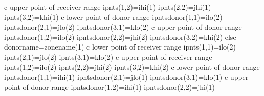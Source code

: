 \documentclass[12pt]{article}
\begin{document}
{\newline c   upper point of receiver range
\newline\indent\indent\indent      ipnts(1,2)=ihi(1)
\newline\indent\indent\indent      ipnts(2,2)=jhi(1)
\newline\indent\indent\indent      ipnts(3,2)=khi(1)
\newline c   lower point of donor range
\newline\indent\indent\indent      ipntsdonor(1,1)=ilo(2)
\newline\indent\indent\indent      ipntsdonor(2,1)=jlo(2)
\newline\indent\indent\indent      ipntsdonor(3,1)=klo(2)
\newline c   upper point of donor range
\newline\indent\indent\indent      ipntsdonor(1,2)=ilo(2)
\newline\indent\indent\indent      ipntsdonor(2,2)=jhi(2)
\newline\indent\indent\indent      ipntsdonor(3,2)=khi(2)
\newline\indent\indent   else
\newline\indent\indent\indent      donorname=zonename(1)
\newline c   lower point of receiver range
\newline\indent\indent\indent      ipnts(1,1)=ilo(2)
\newline\indent\indent\indent      ipnts(2,1)=jlo(2)
\newline\indent\indent\indent      ipnts(3,1)=klo(2)
\newline c   upper point of receiver range
\newline\indent\indent\indent      ipnts(1,2)=ilo(2)
\newline\indent\indent\indent      ipnts(2,2)=jhi(2)
\newline\indent\indent\indent      ipnts(3,2)=khi(2)
\newline c   lower point of donor range
\newline\indent\indent\indent      ipntsdonor(1,1)=ihi(1)
\newline\indent\indent\indent      ipntsdonor(2,1)=jlo(1)
\newline\indent\indent\indent      ipntsdonor(3,1)=klo(1)
\newline c   upper point of donor range
\newline\indent\indent\indent      ipntsdonor(1,2)=ihi(1)
\newline\indent\indent\indent      ipntsdonor(2,2)=jhi(1)
}
\end{document}
